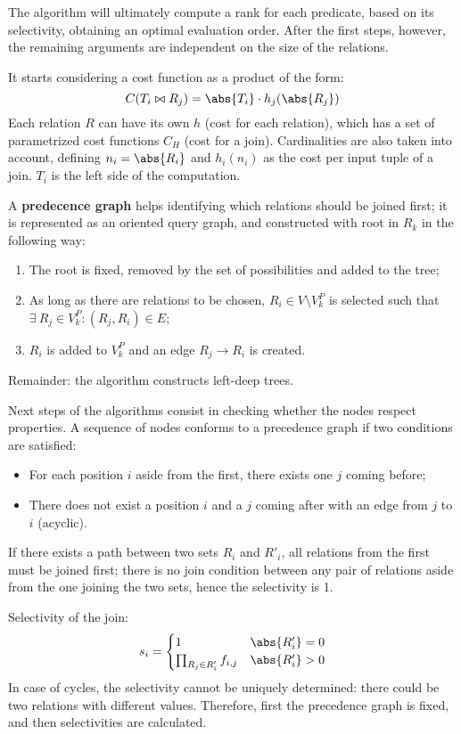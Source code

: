 The algorithm will ultimately compute a rank for each predicate, based on its selectivity, obtaining an optimal evaluation order. After the first steps, however, the remaining arguments are independent on the size of the relations.

It starts considering a cost function as a product of the form:
$$C(T_i \bowtie R_j) = \abs{T_i} \cdot h_j(\abs{R_j})$$
Each relation $R$ can have its own $h$ (cost for each relation), which has a set of parametrized cost functions $C_H$ (cost for a join). Cardinalities are also taken into account, defining $n_i = \abs{R_i}$ and $h_i(n_i)$ as the cost per input tuple of a join. $T_i$ is the left side of the computation.

A \textbf{predecence graph} helps identifying which relations should be joined first; it is represented as an oriented query graph, and constructed with root in $R_k$ in the following way:
\begin{enumerate}
	\item The root is fixed, removed by the set of possibilities and added to the tree;
	\item As long as there are relations to be chosen, $R_i \in V \setminus V_k^P$ is selected such that $\exists\ R_j \in V_k^P : (R_j, R_i) \in E$;
	\item $R_i$ is added to $V_k^P$ and an edge $R_j \rightarrow R_i$ is created.
\end{enumerate}

Remainder: the algorithm constructs left-deep trees.

Next steps of the algorithms consist in checking whether the nodes respect properties. A sequence of nodes conforms to a precedence graph if two conditions are satisfied:
\begin{itemize}
	\item For each position $i$ aside from the first, there exists one $j$ coming before;
	\item There does not exist a position $i$ and a $j$ coming after with an edge from $j$ to $i$ (acyclic).
\end{itemize}

If there exists a path between two sets $R_i$ and $R'_i$, all relations from the first must be joined first; there is no join condition between any pair of relations aside from the one joining the two sets, hence the selectivity is 1.

Selectivity of the join:
$$s_i = \begin{cases}
1 & \abs{R_i'} = 0 \\
\prod_{R_j \in R'_i} f_{i, j} & \abs{R'_i} > 0
\end{cases}$$
In case of cycles, the selectivity cannot be uniquely determined: there could be two relations with different values. Therefore, first the precedence graph is fixed, and then selectivities are calculated.

